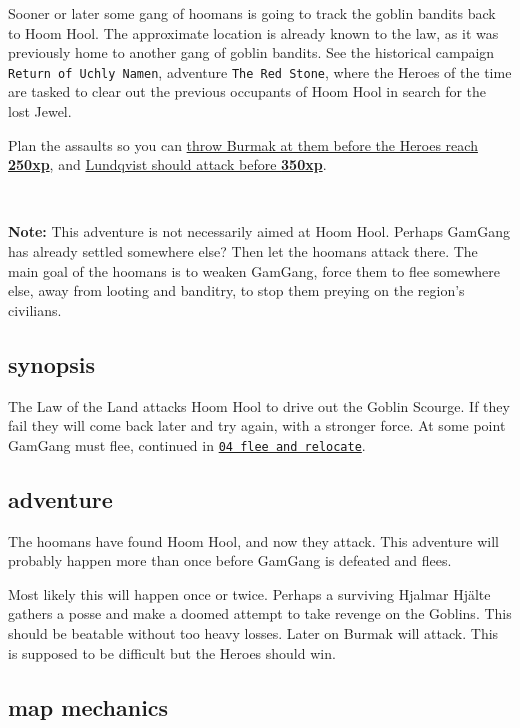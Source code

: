 Sooner or later some gang of hoomans is going to track the goblin bandits back to Hoom Hool. The approximate location is already known to the law, as it was previously home to another gang of goblin bandits. See the historical campaign \texttt{Return of Uchly Namen}, adventure \texttt{The Red Stone}, where the Heroes of the time are tasked to clear out the previous occupants of Hoom Hool in search for the lost Jewel.

Plan the assaults so you can 
\hyperref[appendixburmak]{throw Burmak at them before the Heroes reach \textbf{250xp}}, and 
\hyperref[appendixlundqvist]{Lundqvist should attack before \textbf{350xp}}.

\

\noindent\textbf{Note:} This adventure is not necessarily aimed at Hoom Hool. Perhaps GamGang has already settled somewhere else? Then let the hoomans attack there. The main goal of the hoomans is to weaken GamGang, force them to flee somewhere else, away from looting and banditry, to stop them preying on the region's civilians.


\subsection*{synopsis}

The Law of the Land attacks Hoom Hool to drive out the Goblin Scourge. If they fail they will come back later and try again, with a stronger force. At some point GamGang must flee, continued in \hyperref[04fleeandrelocate]{\texttt{04 flee and relocate}}.


\subsection*{adventure}

The hoomans have found Hoom Hool, and now they attack. This adventure will probably happen more than once before GamGang is defeated and flees.

Most likely this will happen once or twice. Perhaps a surviving Hjalmar Hjälte gathers a posse and make a doomed attempt to take revenge on the Goblins. This should be beatable without too heavy losses.
Later on Burmak will attack. This is supposed to be difficult but the Heroes should win.


\subsection*{map mechanics}

